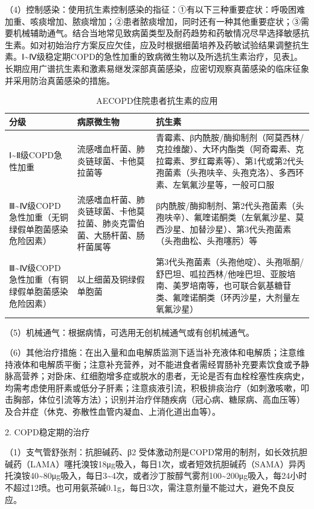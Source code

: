 （4）控制感染：使用抗生素控制感染的指征：①有以下三种重要症状：呼吸困难加重、咳痰增加、脓痰增加；②患者脓痰增加，同时还有一种其他重要症状；③需要机械辅助通气。结合当地常见致病菌类型及耐药趋势和药敏情况尽早选择敏感抗生素。如对初始治疗方案反应欠佳，应及时根据细菌培养及药敏试验结果调整抗生素。Ⅰ\textasciitilde{}Ⅳ级稳定期COPD的急性加重的致病微生物以及所选抗生素治疗，见表\ref{tab1-4-1}。长期应用广谱抗生素和激素易继发深部真菌感染，应密切观察真菌感染的临床征象并采用防治真菌感染的措施。

\begin{longtable}[]{p{4cm}p{5cm}p{6cm}}
  \caption{AECOPD住院患者抗生素的应用}
  \label{tab1-4-1}\\
\toprule
分级 & 病原微生物 & 抗生素\tabularnewline
\midrule
\endhead
Ⅰ\textasciitilde{}Ⅱ级COPD急性加重 &
流感嗜血杆菌、肺炎链球菌、卡他莫拉菌等 &
青霉素、β内酰胺/酶抑制剂（阿莫西林/克拉维酸）、大环内酯类（阿奇霉素、克拉霉素、罗红霉素等）、第1代或第2代头孢菌素（头孢呋辛、头孢克洛）、多西环素、左氧氟沙星等，一般可口服\tabularnewline
Ⅲ\textasciitilde{}Ⅳ级COPD急性加重（无铜绿假单胞菌感染危险因素） &
流感嗜血杆菌、肺炎链球菌、卡他莫拉菌、肺炎克雷伯菌、大肠杆菌、肠杆菌属等
&
β内酰胺/酶抑制剂、第2代头孢菌素（头孢呋辛）、氟喹诺酮类（左氧氟沙星、莫西沙星、加替沙星）、第3代头孢菌素（头孢曲松、头孢噻肟）等\tabularnewline
Ⅲ\textasciitilde{}Ⅳ级COPD急性加重（有铜绿假单胞菌感染危险因素） &
以上细菌及铜绿假单胞菌 &
第3代头孢菌素（头孢他啶）、头孢哌酮/舒巴坦、呱拉西林/他唑巴坦、亚胺培南、美罗培南等，也可联合氨基糖苷类、氟喹诺酮类（环丙沙星，大剂量左氧氟沙星）\tabularnewline
\bottomrule
\end{longtable}

（5）机械通气：根据病情，可选用无创机械通气或有创机械通气。

（6）其他治疗措施：在出入量和血电解质监测下适当补充液体和电解质；注意维持液体和电解质平衡；注意补充营养，对不能进食者需经胃肠补充要素饮食或予静脉高营养；对卧床、红细胞增多症或脱水的患者，无论是否有血栓栓塞性疾病史，均需考虑使用肝素或低分子肝素；注意痰液引流，积极排痰治疗（如刺激咳嗽，叩击胸部，体位引流等方法）；识别并治疗伴随疾病（冠心病、糖尿病、高血压等）及合并症（休克、弥散性血管内凝血、上消化道出血等）。

2. COPD稳定期的治疗

（1）支气管舒张剂：抗胆碱药、β{2}
受体激动剂是COPD常用的制剂，如长效抗胆碱药（LAMA）噻托溴铵18μg吸入，每日1次，或者短效抗胆碱药（SAMA）异丙托溴铵40\textasciitilde{}80μg吸入，每日3\textasciitilde{}4次，或者沙丁胺醇气雾剂100\textasciitilde{}200μg吸入，每24小时不超过12喷。也可用氨茶碱0.1g，每日3次，需注意剂量不能过大，避免不良反应。

